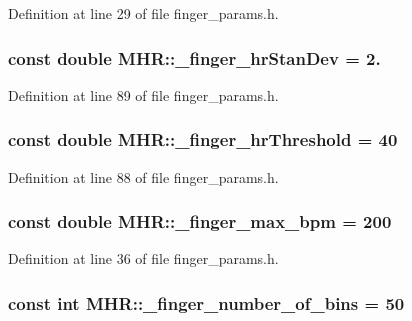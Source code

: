 Definition at line 29 of file finger\+\_\+params.\+h.

\hypertarget{namespace_m_h_r_a418b4c21db49ca7ed9f3546cc04f7210}{
\subsubsection[{\+\_\+finger\+\_\+hr\+Stan\+Dev}]{\setlength{\rightskip}{0pt plus 5cm}const double M\+H\+R\+::\+\_\+finger\+\_\+hr\+Stan\+Dev = 2.}}\label{namespace_m_h_r_a418b4c21db49ca7ed9f3546cc04f7210}


Definition at line 89 of file finger\+\_\+params.\+h.

\hypertarget{namespace_m_h_r_ad34bb64ea8d7aec01e0b4a8ae885c2a6}{
\subsubsection[{\+\_\+finger\+\_\+hr\+Threshold}]{\setlength{\rightskip}{0pt plus 5cm}const double M\+H\+R\+::\+\_\+finger\+\_\+hr\+Threshold = 40}}\label{namespace_m_h_r_ad34bb64ea8d7aec01e0b4a8ae885c2a6}


Definition at line 88 of file finger\+\_\+params.\+h.

\hypertarget{namespace_m_h_r_ae15a1148a0dba9f30071db8315b9fe88}{
\subsubsection[{\+\_\+finger\+\_\+max\+\_\+bpm}]{\setlength{\rightskip}{0pt plus 5cm}const double M\+H\+R\+::\+\_\+finger\+\_\+max\+\_\+bpm = 200}}\label{namespace_m_h_r_ae15a1148a0dba9f30071db8315b9fe88}


Definition at line 36 of file finger\+\_\+params.\+h.

\hypertarget{namespace_m_h_r_a1cd0eaa85c6115e1d53ad1c1a3209b41}{
\subsubsection[{\+\_\+finger\+\_\+number\+\_\+of\+\_\+bins}]{\setlength{\rightskip}{0pt plus 5cm}const int M\+H\+R\+::\+\_\+finger\+\_\+number\+\_\+of\+\_\+bins = 50}}\label{namespace_m_h_r_a1cd0eaa85c6115e1d53ad1c1a3209b41}


